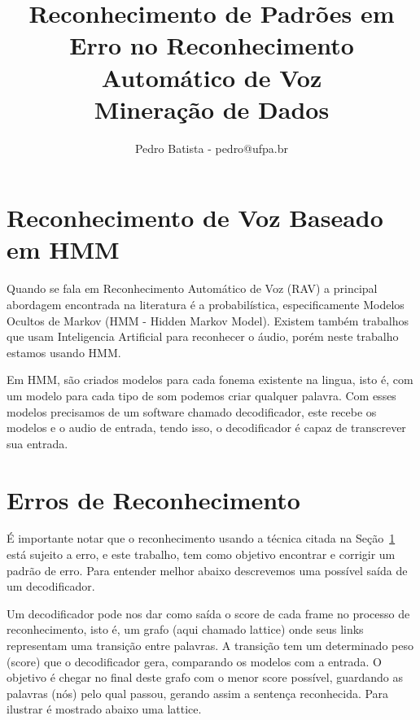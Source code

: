 \documentclass[a4paper]{article}
\title{Reconhecimento de Padrões em Erro no Reconhecimento
   Automático de Voz\\
   Mineração de Dados}
\author{Pedro Batista - pedro@ufpa.br}
\begin{document}
\maketitle

\section{Reconhecimento de Voz Baseado em HMM}\label{sec:rec}

Quando se fala em Reconhecimento Automático de Voz (RAV) a
principal abordagem encontrada na literatura é a probabilística,
especificamente Modelos Ocultos de Markov (HMM - Hidden Markov Model)\cite{htkbook,propor10}.
Existem também trabalhos que usam Inteligencia Artificial para
reconhecer o áudio, porém neste trabalho estamos usando HMM.

Em HMM, são criados modelos para cada fonema existente na lingua,
isto é, com um modelo para cada tipo de som podemos criar qualquer
palavra. Com esses modelos precisamos de um software chamado
decodificador, este recebe os modelos e o audio de entrada,
tendo isso, o decodificador é capaz de transcrever sua entrada.

\section{Erros de Reconhecimento}

É importante notar que o reconhecimento usando a técnica citada
na Seção~\ref{sec:rec} está sujeito a erro, e este trabalho, tem
como objetivo encontrar e corrigir um padrão de erro. Para entender
melhor abaixo descrevemos uma possível saída de um decodificador.

Um decodificador pode nos dar como saída o score de cada frame no
processo de reconhecimento, isto é, um grafo (aqui chamado lattice) onde seus links
representam uma transição entre palavras. A transição tem um determinado
peso (score) que o decodificador gera, comparando os modelos com a entrada.
O objetivo é chegar no final deste grafo com o
menor score possível, guardando as palavras (nós) pelo qual passou,
gerando assim a sentença reconhecida. Para ilustrar é mostrado abaixo
uma lattice.
\end{document}
